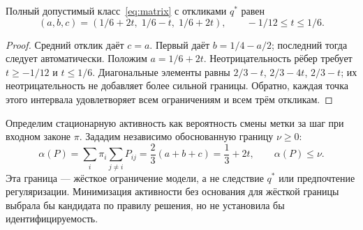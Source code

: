 \begin{theorem}\label{thm:interval}
{Полный допустимый класс~\eqref{eq:matrix} с откликами $q^*$ равен}
\begin{equation}\label{eq:interval}
 (a,b,c)=(1/6+2t,\;1/6-t,\;1/6+2t),\qquad -1/12\leq t\leq1/6.
\end{equation}
\end{theorem}
\begin{proof}
{Средний отклик даёт $c=a$. Первый даёт $b=1/4-a/2$; последний тогда следует автоматически. Положим $a=1/6+2t$. Неотрицательность рёбер требует $t\geq-1/12$ и $t\leq1/6$. Диагональные элементы равны $2/3-t$, $2/3-4t$, $2/3-t$; их неотрицательность не добавляет более сильной границы. Обратно, каждая точка этого интервала удовлетворяет всем ограничениям и всем трём откликам.}
\end{proof}

{Определим стационарную активность как вероятность смены метки за шаг при входном законе $\pi$. Зададим независимо обоснованную границу $\nu\geq0$:}
\begin{equation}\label{eq:activity}
 \alpha(P)=\sum_i\pi_i\sum_{j\ne i}P_{ij}
 =\frac23(a+b+c)=\frac13+2t,\qquad \alpha(P)\leq\nu.
\end{equation}
{Эта граница --- жёсткое ограничение модели, а не следствие $q^*$ или предпочтение регуляризации. Минимизация активности без основания для жёсткой границы выбрала бы кандидата по правилу решения, но не установила бы идентифицируемость.}

